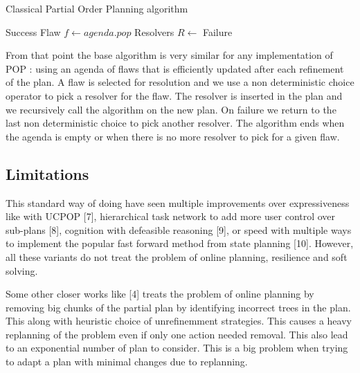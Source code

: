 \documentclass[]{article}
\begin{document}
\begin{algorithm}\caption{Classical Partial Order Planning algorithm}\label{pop}\begin{algorithmic}[1]

\State {} 
 \State \Return Success
 \EndIf
    \State Flaw \(f\gets agenda.pop\)
 \State Resolvers \(R \gets\)
 
 
\State {} 
\State {}
\Else 
            \State {} \EndIf
    \EndFor
    \State \Return Failure 
\EndFunction

\end{algorithmic}\end{algorithm}

From that point the base algorithm is very similar for any
implementation of POP : using an agenda of flaws that is efficiently
updated after each refinement of the plan. A flaw is selected for
resolution and we use a non deterministic choice operator to pick a
resolver for the flaw. The resolver is inserted in the plan and we
recursively call the algorithm on the new plan. On failure we return to
the last non deterministic choice to pick another resolver. The
algorithm ends when the agenda is empty or when there is no more
resolver to pick for a given flaw.

\subsection{Limitations}\label{limitations}

This standard way of doing have seen multiple improvements over
expressiveness like with UCPOP {[}7{]}, hierarchical task network to add
more user control over sub-plans {[}8{]}, cognition with defeasible
reasoning {[}9{]}, or speed with multiple ways to implement the popular
fast forward method from state planning {[}10{]}. However, all these
variants do not treat the problem of online planning, resilience and
soft solving.

Some other closer works like {[}4{]} treats the problem of online
planning by removing big chunks of the partial plan by identifying
incorrect trees in the plan. This along with heuristic choice of
unrefinemment strategies. This causes a heavy replanning of the problem
even if only one action needed removal. This also lead to an exponential
number of plan to consider. This is a big problem when trying to adapt a
plan with minimal changes due to replanning.
\end{document}
